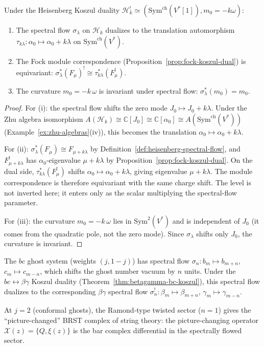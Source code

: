 \begin{proposition}
\label{prop:spectral-flow-kd}
Under the Heisenberg Koszul duality
$\mathcal{H}_k^!
\simeq(\mathrm{Sym}^{\mathrm{ch}}(V^*[1]),m_0=-k\omega)$:
\begin{enumerate}[label=\textup{(\roman*)}]
\item The spectral flow $\sigma_\lambda$ on $\mathcal{H}_k$
 dualizes to the translation automorphism
 $\tau_{k\lambda}: \alpha_0 \mapsto \alpha_0 + k\lambda$ on
 $\mathrm{Sym}^{\mathrm{ch}}(V^*)$.
\item The Fock module correspondence
 \textup{(}Proposition~\textup{\ref{prop:fock-koszul-dual})} is
 equivariant: $\sigma_\lambda^*(F_\mu)^! \cong
 \tau_{k\lambda}^*(F_\mu^!)$.
\item The curvature $m_0 = -k\,\omega$ is invariant under
 spectral flow: $\sigma_\lambda^*(m_0) = m_0$.
\end{enumerate}
\end{proposition}

\begin{proof}
For (i): the spectral flow shifts the zero mode
$J_0 \mapsto J_0 + k\lambda$. Under the Zhu algebra
isomorphism $A(\mathcal{H}_k) \cong \mathbb{C}[J_0]
\cong \mathbb{C}[\alpha_0] \cong A(\mathrm{Sym}^{\mathrm{ch}}(V^*))$
(Example~\ref{ex:zhu-algebras}(iv)), this becomes the translation
$\alpha_0 \mapsto \alpha_0 + k\lambda$.

For (ii): $\sigma_\lambda^*(F_\mu) \cong F_{\mu + k\lambda}$
by Definition~\ref{def:heisenberg-spectral-flow}, and
$F_{\mu + k\lambda}^!$ has $\alpha_0$-eigenvalue
$\mu + k\lambda$ by Proposition~\ref{prop:fock-koszul-dual}.
On the dual side, $\tau_{k\lambda}^*(F_\mu^!)$ shifts
$\alpha_0 \mapsto \alpha_0 + k\lambda$, giving eigenvalue
$\mu + k\lambda$. The module correspondence is therefore equivariant
with the same charge shift. The level is not inverted here; it enters
only as the scalar multiplying the spectral-flow parameter.

For (iii): the curvature $m_0 = -k\,\omega$ lies in
$\mathrm{Sym}^2(V^*)$ and is independent of $J_0$ (it comes from
the quadratic pole, not the zero mode). Since $\sigma_\lambda$
shifts only $J_0$, the curvature is invariant.
\end{proof}

\begin{example}
\label{ex:bc-spectral-flow}
The $bc$ ghost system (weights $(j, 1-j)$) has spectral flow
$\sigma_n: b_m \mapsto b_{m+n}$, $c_m \mapsto c_{m-n}$, which shifts
the ghost number vacuum by $n$ units. Under the
$bc \leftrightarrow \beta\gamma$ Koszul duality
(Theorem~\ref{thm:betagamma-bc-koszul}), this spectral flow dualizes
to the corresponding $\beta\gamma$ spectral flow
$\sigma_n^!: \beta_m \mapsto \beta_{m+n}$,
$\gamma_m \mapsto \gamma_{m-n}$.

At $j = 2$ (conformal ghosts), the Ramond-type twisted sector
($n = 1$) gives the ``picture-changed'' BRST complex of string
theory: the picture-changing operator $\mathcal{X}(z) = \{Q, \xi(z)\}$
is the bar complex differential in the spectrally flowed sector.
\end{example}

